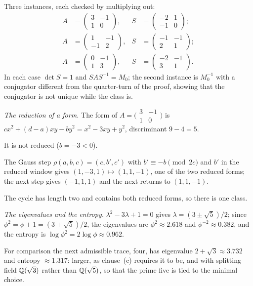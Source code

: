 \documentclass[11pt,a4paper]{article}
\theoremstyle{plain}
\theoremstyle{definition}
\theoremstyle{remark}
\begin{document}
Three instances, each checked by multiplying out:
\begin{align*}
A&=\begin{pmatrix}3&-1\\1&0\end{pmatrix},& S&=\begin{pmatrix}-2&1\\-1&0\end{pmatrix};\\
A&=\begin{pmatrix}1&-1\\-1&2\end{pmatrix},& S&=\begin{pmatrix}-1&-1\\2&1\end{pmatrix};\\
A&=\begin{pmatrix}0&-1\\1&3\end{pmatrix},& S&=\begin{pmatrix}-2&-1\\3&1\end{pmatrix}.
\end{align*}
In each case $\det S=1$ and $SAS^{-1}=M_{0}$; the second instance is $M_{0}^{-1}$ with a conjugator different from the quarter-turn of the proof, showing that the conjugator is not unique while the class is.

\emph{The reduction of a form.} The form of $A=\bigl(\begin{smallmatrix}3&-1\\1&0\end{smallmatrix}\bigr)$ is $cx^{2}+(d-a)xy-by^{2}=x^{2}-3xy+y^{2}$, discriminant $9-4=5$.

It is not reduced ($b=-3<0$).

The Gauss step $\rho(a,b,c)=(c,b',c')$ with $b'\equiv-b\pmod{2c}$ and $b'$ in the reduced window gives $(1,-3,1)\mapsto(1,1,-1)$, one of the two reduced forms; the next step gives $(-1,1,1)$ and the next returns to $(1,1,-1)$.

The cycle has length two and contains both reduced forms, so there is one class.

\emph{The eigenvalues and the entropy.} $\lambda^{2}-3\lambda+1=0$ gives $\lambda=(3\pm\sqrt5)/2$; since $\phi^{2}=\phi+1=(3+\sqrt5)/2$, the eigenvalues are $\phi^{2}\approx2.618$ and $\phi^{-2}\approx0.382$, and the entropy is $\log\phi^{2}=2\log\phi\approx0.962$.

For comparison the next admissible trace, four, has eigenvalue $2+\sqrt3\approx3.732$ and entropy $\approx1.317$: larger, as clause~(c) requires it to be, and with splitting field $\mathbb{Q}(\sqrt3)$ rather than $\mathbb{Q}(\sqrt5)$, so that the prime five is tied to the minimal choice.
\end{document}
